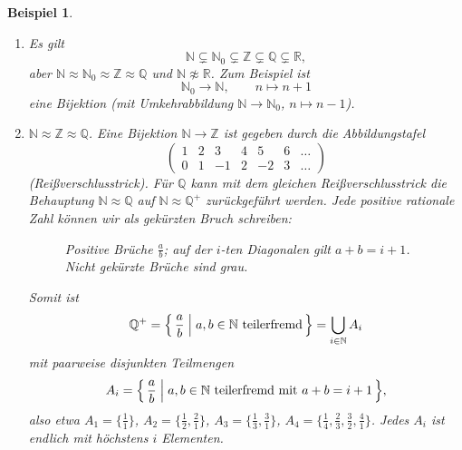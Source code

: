 \documentclass[a4paper]{article}
\theoremstyle{kurzskript}
\newtheorem{beispiel}[satz]{Beispiel}
\newcommand{\N}{\mathbb{N}}
\newcommand{\Z}{\mathbb{Z}}
\newcommand{\Q}{\mathbb{Q}}
\newcommand{\R}{\mathbb{R}}
\begin{document}
\begin{beispiel}
\leavevmode
\begin{enumerate}[label=(\alph*)]
  \item Es gilt
  \[
    \N \subsetneq \N_0 \subsetneq \Z \subsetneq \Q \subsetneq \R,
  \]
  aber $\N \approx \N_0 \approx \Z \approx \Q$ und $\N \not\approx \R$. Zum Beispiel ist
  \[
    \N_0 \to \N, \qquad n \mapsto n + 1
  \]
  eine Bijektion (mit Umkehrabbildung $\N \to \N_0$, $n \mapsto n - 1$).

  \item $\N \approx \Z \approx \Q$. Eine Bijektion $\N \to \Z$ ist gegeben durch die Abbildungstafel
  \[
    \begin{pmatrix} 1 & 2 & 3 & 4 & 5 & 6 & \dots \\ 0 & 1 & -1 & 2 & -2 & 3 & \dots \end{pmatrix}
  \]
  (\glqq Reißverschlusstrick\grqq). Für $\Q$ kann mit dem gleichen Reißverschlusstrick die Behauptung $\N \approx \Q$ auf $\N \approx \Q^+$ zurückgeführt werden. Jede positive rationale Zahl können wir als gekürzten Bruch schreiben:
  \begin{figure}[H]
  \centering
  \caption{Positive Brüche $\frac{a}{b}$; auf der $i$-ten Diagonalen gilt $a + b = i + 1$. Nicht gekürzte Brüche sind grau.}
  \end{figure}
  Somit ist
  \[
    \Q^+ = \Bigl\{\, \frac{a}{b} \Bigm| a, b \in \N \text{ teilerfremd} \,\Bigr\} = \bigcup_{i \in \N} A_i
  \]
  mit paarweise disjunkten Teilmengen
  \[
    A_i = \Bigl\{\, \frac{a}{b} \Bigm| a, b \in \N \text{ teilerfremd mit } a + b = i + 1 \,\Bigr\},
  \]
  also etwa $A_1 = \{\frac{1}{1}\}$, $A_2 = \{\frac{1}{2}, \frac{2}{1}\}$, $A_3 = \{\frac{1}{3}, \frac{3}{1}\}$, $A_4 = \{\frac{1}{4}, \frac{2}{3}, \frac{3}{2}, \frac{4}{1}\}$. Jedes $A_i$ ist endlich mit höchstens $i$ Elementen.


\end{enumerate}
\end{beispiel}
\end{document}
